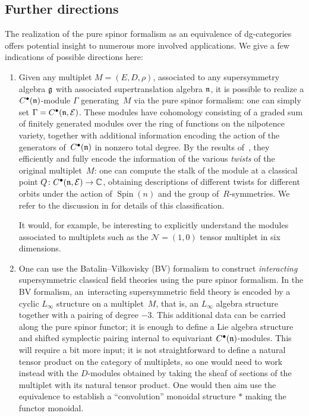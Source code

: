 \documentclass[pdftex]{sigma}
\numberwithin{equation}{section}
\def\cE{\mathcal E}\def\cF{\mathcal F}\def\cG{\mathcal G}\def\cH{\mathcal H}
\def\bu{\bullet}
\DeclareMathOperator{\Spin}{Spin}
\begin{document}
\subsection*{Further directions}
The realization of the pure spinor formalism as an equivalence of dg-categories offers potential insight to numerous more involved applications. We give a few indications of possible directions here:
\begin{enumerate}\itemsep=0pt
	\item Given any multiplet $M=(E,D,\rho)$, associated to any supersymmetry algebra $\mathfrak g$ with associated supertranslation algebra $\mathfrak n$, it is possible to realize a $C^\bullet(\mathfrak n)$-module $\Gamma$ generating~$M$ via the pure spinor formalism: one can simply set $\Gamma = C^\bullet(\fn, \cE)$. These modules have cohomology consisting of a graded sum of finitely generated modules over the ring of functions on the nilpotence variety, together with additional information encoding the action of the generators of~$C^\bu(\fn)$ in nonzero total degree. By the results of~\cite{spinortwist}, they efficiently and fully encode the information of the various \emph{twists} of the original multiplet~$M$: one can compute the stalk of the module at a classical point $Q \colon C^\bullet(\fn, \cE) \to \CC$, obtaining descriptions of different twists for different orbits under the action of $\Spin(n)$ and the group of~$R$-symmetries. We refer to the discussion in \cite{NV, ElliottSafronov, ESW} for details of this classification.
	
	It would, for example, be interesting to explicitly understand the modules associated to multiplets such as the $\mathcal N = (1,0)$ tensor multiplet in six dimensions.
	
	\item One can use the Batalin--Vilkovisky (BV) formalism to construct \emph{interacting} supersymmetric classical field theories using the pure spinor formalism. In the BV formalism, an~interacting supersymmetric field theory is encoded by a cyclic $L_\infty$ structure on a multiplet~$M$, that is, an $L_\infty$ algebra structure together with a pairing of degree $-3$. This additional data can be carried along the pure spinor functor; it is enough to define a Lie algebra structure and shifted symplectic pairing internal to equivariant $C^\bullet(\mathfrak n)$-modules. This will require a bit more input; it is not straightforward to define a natural tensor product on the category of multiplets, so one would need to work instead with the $D$-modules obtained by taking the sheaf of sections of the multiplet with its natural tensor product. One would then aim use the equivalence to establish a ``convolution'' monoidal structure $\ast$ making the functor monoidal.
	

\end{enumerate}
\end{document}
